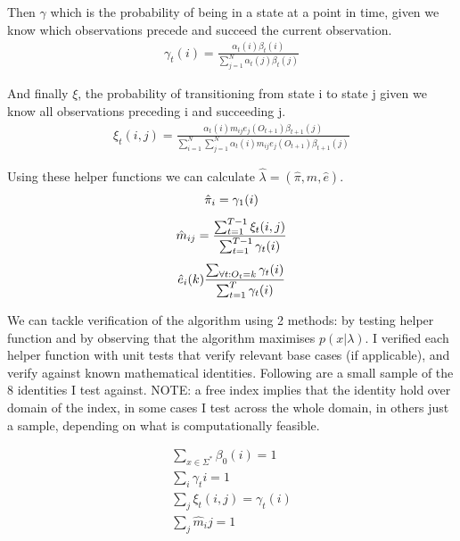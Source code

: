 Then $\gamma$ which is the probability of being in a state at a point in time, given we know which observations precede and succeed the current observation.
\begin{gather*}
    \gamma_t(i) = \frac{\alpha_t(i) \beta_t(i)}{\sum_{j=1}^N \alpha_t(j) \beta_t(j)}
\end{gather*}

And finally $\xi$, the probability of transitioning from state i to state j given we know all observations preceding i and succeeding j.
\begin{gather*}
    \xi_t(i, j) = \frac{\alpha_t(i) m_{ij} e_j(O_{t+1}) \beta_{t+1}(j)}{\sum_{i=1}^N \sum_{j=1}^N \alpha_t(i) m_{ij} e_j(O_{t+1}) \beta_{t+1}(j)}
\end{gather*}

Using these helper functions we can calculate $\hat{\lambda}=(\hat{\pi}, \hat{m}, \hat{e})$.
\begin{gather*}
    \hat{\pi}_i = \gamma_1(i)\biggbreak
    \hat{m}_{ij} = \frac{\sum_{t=1}^{T-1} \xi_t(i,j)}{\sum_{t=1}^{T-1} \gamma_t(i)}\biggbreak
    \hat{e}_i(k) \frac{\sum_{\forall t: O_t = k} \gamma_t(i)}{\sum_{t=1}^T \gamma_t(i)}
\end{gather*}


We can tackle verification of the algorithm using 2 methods: by testing helper function and by observing that the algorithm maximises $p(x|\lambda)$.
I verified each helper function with unit tests that verify relevant base cases (if applicable), and verify against known mathematical identities.
Following are a small sample of the 8 identities I test against.
NOTE: a free index implies that the identity hold over domain of the index, in some cases I test across the whole domain, in others just a sample, depending on what is computationally feasible.

\begin{gather*}
    \sum_{x \in \Sigma^*} \beta_0(i) = 1\\
    \sum_{i} \gamma_t{i} = 1\\
    \sum_{j} \xi_t(i,j) = \gamma_t(i)\\
    \sum_j \hat{m}_ij = 1\\
\end{gather*}


